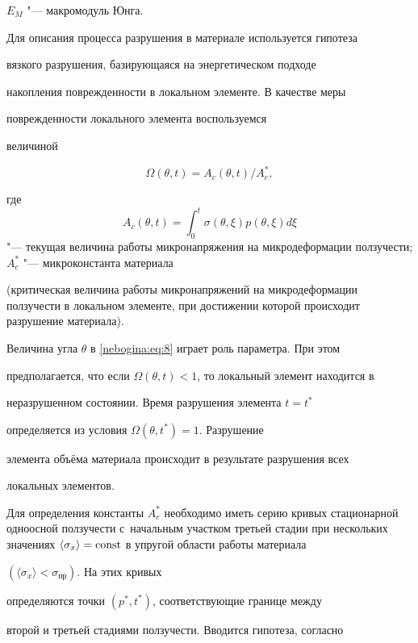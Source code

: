 $E_M$ "--- макромодуль Юнга.



Для описания процесса разрушения в материале используется гипотеза

вязкого разрушения, базирующаяся на энергетическом подходе

накопления поврежденности в локальном элементе. В качестве меры

поврежденности локального элемента воспользуемся

величиной~\cite{nebogina:bib5}

\begin{equation}

\label{nebogina:eq:8}

 \Omega (\theta, t)= {A_c (\theta, t)}/{A_c^*},

\end{equation}

где $$A_c(\theta, t)= \int _0^t \sigma (\theta, \xi) p (\theta, \xi)d\xi$$ "--- текущая величина работы микронапряжения на микродеформации ползучести; $A_c^*$ "--- микроконстанта материала

(критическая величина работы микронапряжений на микродеформации ползучести в локальном элементе, при достижении которой происходит разрушение материала).



Величина угла $\theta$ в \eqref{nebogina:eq:8} играет роль параметра. При этом

предполагается, что если $\Omega (\theta, t)<1$, то локальный элемент находится в

неразрушенном состоянии. Время разрушения элемента $t=t^*$

определяется из условия ${\Omega (\theta, t^*)=}1$. Разрушение

элемента объёма материала происходит в результате разрушения всех

локальных элементов.



Для определения константы $A_c^*$ необходимо иметь серию кривых стационарной одноосной ползучести с~начальным участком третьей стадии при нескольких значениях $\langle\sigma_x\rangle=

\rm{const}$ в упругой области работы материала

$(\langle\sigma_x\rangle<\sigma_\text{пр})$. На этих кривых

определяются точки $(p^*, t^*)$, соответствующие границе между

второй и третьей стадиями ползучести. Вводится гипотеза, согласно

